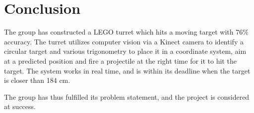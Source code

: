 \section*{Conclusion}
The group has constructed a LEGO turret which hits a moving target with 76\% accuracy. The turret utilizes computer vision via a Kinect camera to identify a circular target and various trigonometry to place it in a coordinate system, aim at a predicted position and fire a projectile at the right time for it to hit the target. 
The system works in real time, and is within its deadline when the target is closer than 184 cm.

The group has thus fulfilled its problem statement, and the project is considered at success.